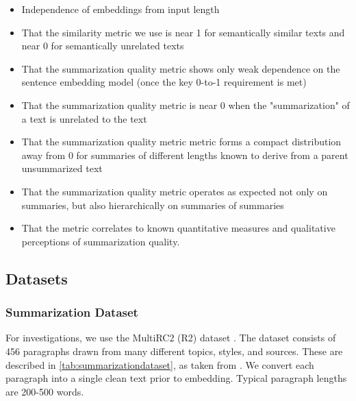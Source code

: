 \documentclass{article}
\begin{document}
\begin{itemize}
	\item Independence of embeddings from input length
	\item That the similarity metric we use is near 1 for semantically similar texts and near 0 for semantically unrelated texts
    \item That the summarization quality metric shows only weak dependence on the sentence embedding model (once the key 0-to-1 requirement is met)
	\item That the summarization quality metric is near 0 when the "summarization" of a text is unrelated to the text
	\item That the summarization quality metric metric forms a compact distribution away from 0 for summaries of different lengths known to derive from a parent unsummarized text
	\item That the summarization quality metric operates as expected not only on summaries, but also hierarchically on summaries of summaries
	\item That the metric correlates to known quantitative measures and qualitative perceptions of summarization quality.
\end{itemize}

\subsection{Datasets}

\subsubsection{Summarization Dataset}
For investigations, we use the MultiRC2 (R2) dataset \citep{multirc2}.
The dataset consists of 456 paragraphs drawn from many different topics, styles, and sources.
These are described in \ref{tab:summarizationdataset}, as taken from \citep{multirc2}.
We convert each paragraph into a single clean text prior to embedding.
Typical paragraph lengths are 200-500 words.
\end{document}
